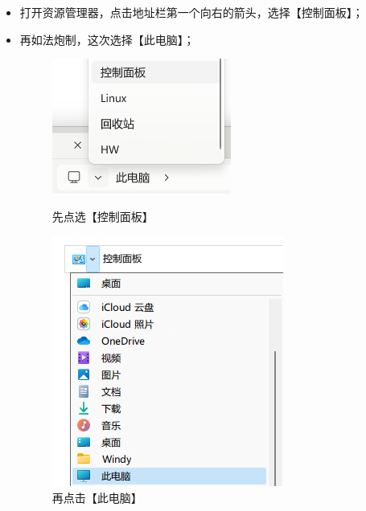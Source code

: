 \begin{itemize}
  \item 打开资源管理器，点击地址栏第一个向右的箭头，选择【控制面板】；
  \item 再如法炮制，这次选择【此电脑】；
    \begin{figure}[htb!]
      \begin{minipage}{.49\textwidth}
        \centering
        \includegraphics[width=.6\textwidth]{assets/advanced/go-to-control.png}
        \caption{先点选【控制面板】}
        \label{fig:go-to-control}
      \end{minipage}
      \begin{minipage}{.49\textwidth}
        \centering
        \includegraphics[width=.8\textwidth]{assets/advanced/back-to-this-pc.png}
        \caption{再点击【此电脑】}
        \label{fig:back-to-this-pc}
      \end{minipage}
    \end{figure}

\end{itemize}
